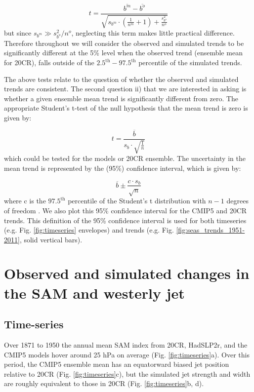 \documentclass{ametsoc}
\begin{document}
\begin{equation}
t = \frac{\overline{b^m} - \overline{b^o}}
{\sqrt{ s_{b^m} \cdot \left( \frac{1}{n^m} + 1 \right) + \frac{s_{b^o}^2}{n^o}}} 
\end{equation} 
but since $s_{b^m} \gg s_{b^o}^2/n^o$, neglecting this term makes little practical difference. Therefore 
throughout we will consider the observed and simulated trends to be significantly different at the
5\% level when the observed trend (ensemble mean for 20CR), falls outside of the 
$2.5^{\textrm{th}}-97.5^{\textrm{th}}$ 
percentile of the simulated trends.

The above tests relate to the question of whether the observed and simulated trends are consistent. 
The second question ii) that we are interested in asking is whether a given ensemble mean
trend is significantly different from zero. The appropriate Student's t-test of the null
hypothesis that the mean trend is zero is given by:

\begin{equation}
t = \frac{\overline{b}}{s_{b} \cdot \sqrt{\frac{1}{n}}}
\end{equation} 
which could be tested for the models or 20CR ensemble. The uncertainty in the mean trend is
represented by the (95\%) confidence interval, which is given by:

\begin{equation}
\overline{b} \pm \frac{c \cdot s_b}{\sqrt{n}}
\end{equation} 
where c is the $97.5^{\textrm{th}}$ percentile of the Student's t distribution with $n-1$ 
degrees of freedom \citep{von_Storch_and_Zwiers_1999}. We also plot this 95\% confidence interval for the CMIP5 and 20CR trends. This
definition of the 95\% confidence interval is used for both timeseries (e.g. Fig. \ref{fig:timeseries} 
envelopes) and trends (e.g. Fig. \ref{fig:seas_trends_1951-2011}, solid vertical bars). 

\section{Observed and simulated changes in the SAM and westerly jet} \label{sec:obs_sim_changes}
\subsection{Time-series}
Over 1871 to 1950 the annual mean SAM index from 20CR, HadSLP2r, and the 
CMIP5 models hover around 25 hPa on average (Fig. \ref{fig:timeseries}a). 
Over this period, the CMIP5 ensemble mean has an equatorward biased jet position  
relative to 20CR (Fig. \ref{fig:timeseries}c), but the simulated 
jet strength and width are roughly
equivalent to those in 20CR (Fig. \ref{fig:timeseries}b, d). 
\end{document}
